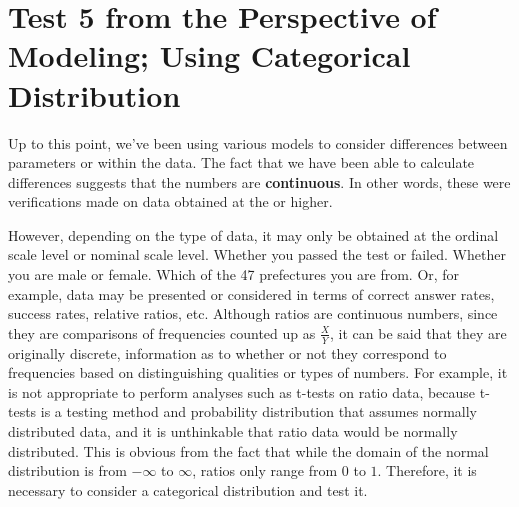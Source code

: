 \documentclass{ltjsbook}
\begin{document}
\VerbatimFootnotes
\chapter{Test 5 from the Perspective of Modeling; Using Categorical Distribution}
\label{x23_modeling5}
Up to this point, we've been using various models to consider differences between parameters or within the data. The fact that we have been able to calculate differences suggests that the numbers are \textbf{continuous}. In other words, these were verifications made on data obtained at the  or higher.

However, depending on the type of data, it may only be obtained at the ordinal scale level or nominal scale level. Whether you passed the test or failed. Whether you are male or female. Which of the 47 prefectures you are from. Or, for example, data may be presented or considered in terms of correct answer rates, success rates, relative ratios, etc. Although ratios are continuous numbers, since they are comparisons of frequencies counted up as $\frac{X}{Y}$, it can be said that they are originally discrete, information as to whether or not they correspond to frequencies based on distinguishing qualities or types of numbers. For example, it is not appropriate to perform analyses such as t-tests on ratio data, because t-tests is a testing method and probability distribution that assumes normally distributed data, and it is unthinkable that ratio data would be normally distributed. This is obvious from the fact that while the domain of the normal distribution is from $-\infty$ to $\infty$, ratios only range from $0$ to $1$. Therefore, it is necessary to consider a categorical distribution and test it.
\end{document}
